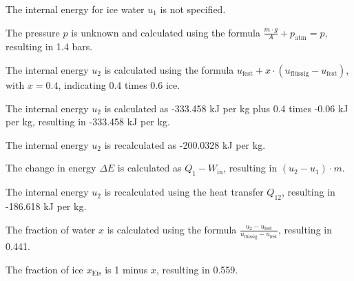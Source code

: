 The internal energy for ice water \( u_1 \) is not specified.

The pressure \( p \) is unknown and calculated using the formula \( \frac{m \cdot g}{A} + p_{\text{atm}} = p \), resulting in 1.4 bars.

The internal energy \( u_2 \) is calculated using the formula \( u_{\text{fest}} + x \cdot (u_{\text{flüssig}} - u_{\text{fest}}) \), with \( x = 0.4 \), indicating 0.4 times 0.6 ice.

The internal energy \( u_2 \) is calculated as -333.458 kJ per kg plus 0.4 times -0.06 kJ per kg, resulting in -333.458 kJ per kg.

The internal energy \( u_2 \) is recalculated as -200.0328 kJ per kg.

The change in energy \( \Delta E \) is calculated as \( Q_{1} - W_{\text{in}} \), resulting in \( (u_2 - u_1) \cdot m \).

The internal energy \( u_2 \) is recalculated using the heat transfer \( Q_{12} \), resulting in -186.618 kJ per kg.

The fraction of water \( x \) is calculated using the formula \( \frac{u_2 - u_{\text{fest}}}{u_{\text{flüssig}} - u_{\text{fest}}} \), resulting in 0.441.

The fraction of ice \( x_{\text{Eis}} \) is 1 minus \( x \), resulting in 0.559.